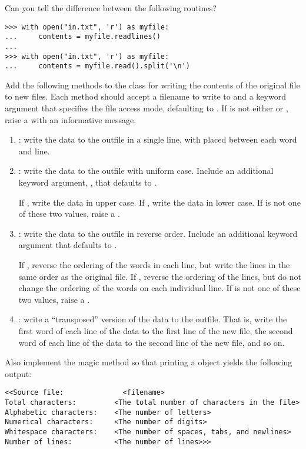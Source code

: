 Can you tell the difference between the following routines?
\begin{lstlisting}
>>> with open("in.txt", 'r') as myfile:
...     contents = myfile.readlines()
...
>>> with open("in.txt", 'r') as myfile:
...     contents = myfile.read().split('\n')
\end{lstlisting}

\begin{problem} %
Add the following methods to the  class for writing the contents of the original file to new files.
Each method should accept a filename to write to and a keyword argument  that specifies the file access mode, defaulting to .
If  is not either  or , raise a  with an informative message.

\begin{enumerate}

\item {}: write the data to the outfile in a single line, with  placed between each word and line.

\item {}: write the data to the outfile with uniform case. Include an additional keyword argument, , that defaults to .

If , write the data in upper case. If , write the data in lower case. If  is not one of these two values, raise a .

\item {}: write the data to the outfile in reverse order. Include an additional keyword argument  that defaults to .

If , reverse the ordering of the words in each line, but write the lines in the same order as the original file. If , reverse the ordering of the lines, but do not change the ordering of the words on each individual line. If  is not one of these two values, raise a .

\item {}: write a ``transposed'' version of the data to the outfile. That is, write the first word of each line of the data to the first line of the new file, the second word of each line of the data to the second line of the new file, and so on.
\end{enumerate}

Also implement the  magic method so that printing a  object yields the following output:
\begin{lstlisting}
<<Source file:              <filename>
Total characters:         <The total number of characters in the file>
Alphabetic characters:    <The number of letters>
Numerical characters:     <The number of digits>
Whitespace characters:    <The number of spaces, tabs, and newlines>
Number of lines:          <The number of lines>>>
\end{lstlisting}
\end{problem}

